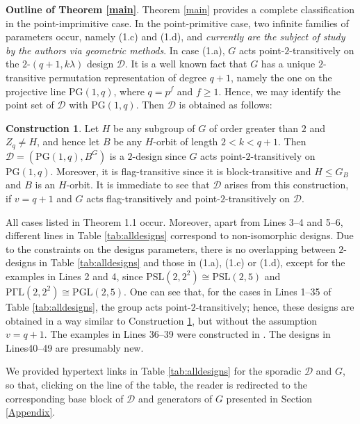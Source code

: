 \documentclass[a4paper,twopage,reqno,12pt]{amsart}
\theoremstyle{definition}
\newtheorem{construction}[theorem]{Construction}
\numberwithin{equation}{section}
\newcommand{\PSL}{\mathrm{PSL}}
\newcommand{\PGL}{\mathrm{PGL}}
\newcommand{\PGaL}{\mathrm{P\Gamma L}}
\newcommand{\PG}{\mathrm{PG}}
\renewcommand{\leq}{\leqslant}
\renewcommand{\geq}{\geqslant}
\begin{document}
\noindent \textbf{Outline of Theorem \ref{main}}. Theorem \ref{main} provides a complete classification in the point-imprimitive case. In the point-primitive case, two infinite families of parameters occur, namely (1.c) and (1.d), and \emph{currently are the subject of study by the authors via geometric methods}. In case (1.a), $G$ acts point-$2$-transitively on the $2$-$(q+1,k\lambda)$ design $\mathcal{D}$. It is a well known fact that $G$ has a unique $2$-transitive permutation representation of degree $q+1$, namely the one on the projective line $\PG(1,q)$, where $q=p^{f}$ and $f \geq 1$. Hence, we may identify the point set of $\mathcal{D}$ with $\PG(1,q)$. Then $\mathcal{D}$ is obtained as follows:
\begin{construction} \label{Build}
Let $H$ be any subgroup of $G$ of order greater than $2$ and $Z_{q}\neq H$, and hence let $B$ be any $H$-orbit of length $2<k<q+1$. Then $\mathcal{D}=(\PG(1,q),B^{G})$ is a $2$-design since $G$ acts point-$2$-transitively on $\PG(1,q)$. Moreover, it is flag-transitive since it is block-transitive and $H\leq G_{B}$ and $B$ is an $H$-orbit. It is immediate to see that $\mathcal{D}$ arises from this construction, if $v=q+1$ and $G$ acts flag-transitively and point-$2$-transitively on $\mathcal{D}$.      
\end{construction}

All cases listed in Theorem 1.1 occur. Moreover, apart from Lines 3--4 and 5--6, different lines in Table \ref{tab:alldesigns} correspond to non-isomorphic designs. Due to the constraints on the designs parameters, there is no overlapping between $2$-designs in Table \ref{tab:alldesigns} and those in (1.a), (1.c) or (1.d), except for the examples in Lines 2 and 4, since $\PSL(2,2^{2})\cong \PSL(2,5)$ and $\PGaL(2,2^{2})\cong \PGL(2,5)$. 
One can see that, for the cases in Lines 1--35 of Table \ref{tab:alldesigns},
the group acts point-$2$-transitively; hence, these designs are obtained in a 
way similar to Construction \ref{Build},
but without the assumption $v=q+1$. The examples in Lines 36--39 were constructed in \cite{MF}. The designs in Lines40--49 are presumably new.


We provided hypertext links in Table \ref{tab:alldesigns} for the sporadic $\mathcal{D}$ and $G$, so that, clicking on the line of the table, the reader is redirected to the corresponding base block of $\mathcal{D}$ and generators of $G$ presented in Section \ref{Appendix}.
\end{document}
